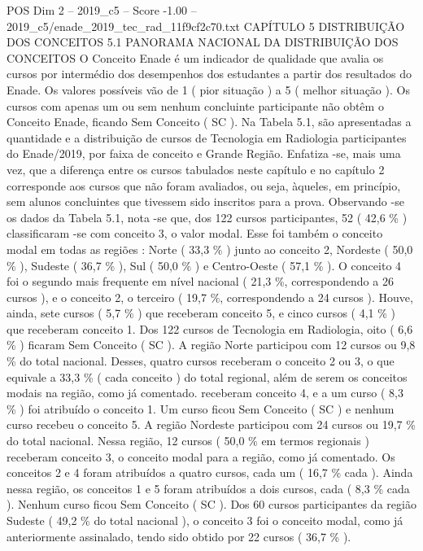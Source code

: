 \begin{textsample}{POS Dim 2 – 2019\_c5 – Score -1.00 – 2019\_c5/enade\_2019\_tec\_rad\_11f9cf2c70.txt}  \label{ex:f2_pos_340}
CAPÍTULO 5 DISTRIBUIÇÃO DOS CONCEITOS 5.1 PANORAMA NACIONAL DA DISTRIBUIÇÃO DOS CONCEITOS O Conceito Enade é um indicador de qualidade que avalia os cursos por intermédio dos desempenhos dos estudantes a partir dos resultados do Enade.
Os valores possíveis vão de 1 ( pior situação ) a 5 ( melhor situação ).
Os cursos com apenas um ou sem nenhum concluinte participante não obtêm o Conceito Enade, ficando Sem Conceito ( SC ).
Na Tabela 5.1, são apresentadas a quantidade e a distribuição de cursos de Tecnologia em Radiologia participantes do Enade/2019, por faixa de conceito e Grande Região.
Enfatiza -se, mais uma vez, que a diferença entre os cursos tabulados neste capítulo e no capítulo 2 corresponde aos cursos que não foram avaliados, ou seja, àqueles, em princípio, sem alunos concluintes que tivessem sido inscritos para a prova.
Observando -se os dados da Tabela 5.1, nota -se que, dos 122 cursos participantes, 52 ( 42,6 \% ) classificaram -se com conceito 3, o valor modal.
Esse foi também o conceito modal em todas as regiões : Norte ( 33,3 \% ) junto ao conceito 2, Nordeste ( 50,0 \% ), Sudeste ( 36,7 \% ), Sul ( 50,0 \% ) e Centro-Oeste ( 57,1 \% ).
O conceito 4 foi o segundo mais frequente em nível nacional ( 21,3 \%, correspondendo a 26 cursos ), e o conceito 2, o terceiro ( 19,7 \%, correspondendo a 24 cursos ).
Houve, ainda, sete cursos ( 5,7 \% ) que receberam conceito 5, e cinco cursos ( 4,1 \% ) que receberam conceito 1.
Dos 122 cursos de Tecnologia em Radiologia, oito ( 6,6 \% ) ficaram Sem Conceito ( SC ).
A região Norte participou com 12 cursos ou 9,8 \% do total nacional.
Desses, quatro cursos receberam o conceito 2 ou 3, o que equivale a 33,3 \% ( cada conceito ) do total regional, além de serem os conceitos modais na região, como já comentado. receberam conceito 4, e a um curso ( 8,3 \% ) foi atribuído o conceito 1.
Um curso ficou Sem Conceito ( SC ) e nenhum curso recebeu o conceito 5.
A região Nordeste participou com 24 cursos ou 19,7 \% do total nacional.
Nessa região, 12 cursos ( 50,0 \% em termos regionais ) receberam conceito 3, o conceito modal para a região, como já comentado.
Os conceitos 2 e 4 foram atribuídos a quatro cursos, cada um ( 16,7 \% cada ).
Ainda nessa região, os conceitos 1 e 5 foram atribuídos a dois cursos, cada ( 8,3 \% cada ).
Nenhum curso ficou Sem Conceito ( SC ).
Dos 60 cursos participantes da região Sudeste ( 49,2 \% do total nacional ), o conceito 3 foi o conceito modal, como já anteriormente assinalado, tendo sido obtido por 22 cursos ( 36,7 \% ).

\end{textsample}
